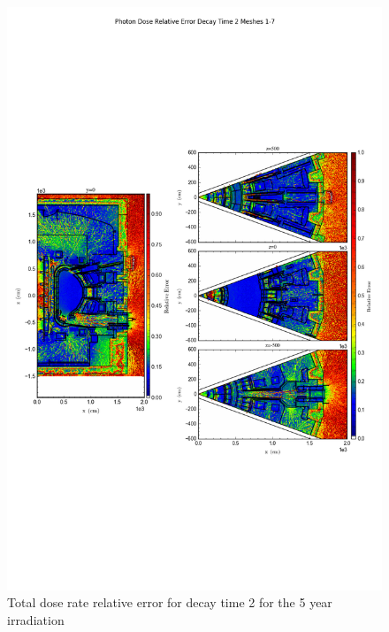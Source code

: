 \documentclass[12pt]{article}
\begin{document}
\begin{figure}[ht!]
\centering
\includegraphics[trim={0cm 8cm, 0cm 8cm},clip,scale=0.75]{../plots/final_model_with_b4c/5year/Photon_Dose_Relative_Error_Decay_Time_2_Meshes_1-7.png}
\caption{Total dose rate relative error for decay time 2 for the 5 year irradiation}
\label{fig:photons_5y_dc2_nob4c_relerr}
\end{figure}
\clearpage
\end{document}
